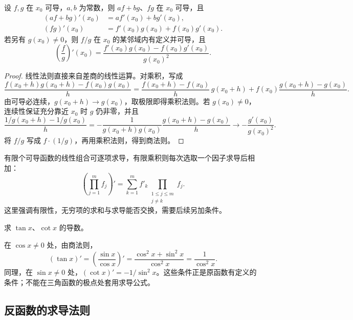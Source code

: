 \documentclass[UTF8,12pt,a4paper,fontset=fandol]{ctexbook}
\begin{document}
\begin{theorem}
\label{thm:arithmetic-differentiation-rules}
设 $f,g$ 在 $x_0$ 可导，$a,b$ 为常数，则 $af+bg$、$fg$ 在 $x_0$ 可导，且
\begin{align}
    (af+bg)'(x_0)&=af'(x_0)+bg'(x_0),\label{eq:derivative-linearity}\\
    (fg)'(x_0)&=f'(x_0)g(x_0)+f(x_0)g'(x_0).\label{eq:derivative-product-rule}
\end{align}
若另有 $g(x_0)\ne0$，则 $f/g$ 在 $x_0$ 的某邻域内有定义并可导，且
\begin{equation}
\label{eq:derivative-quotient-rule}
    \left(\frac fg\right)'(x_0)
    =\frac{f'(x_0)g(x_0)-f(x_0)g'(x_0)}{g(x_0)^2}.
\end{equation}
\end{theorem}
\begin{proof}
线性法则直接来自差商的线性运算。对乘积，写成
\[
    \frac{f(x_0+h)g(x_0+h)-f(x_0)g(x_0)}h
    =\frac{f(x_0+h)-f(x_0)}h\,g(x_0+h)
    +f(x_0)\frac{g(x_0+h)-g(x_0)}h.
\]
由可导必连续，$g(x_0+h)\to g(x_0)$，取极限即得乘积法则。若 $g(x_0)\ne0$，连续性保证充分靠近 $x_0$ 时 $g$ 仍非零，并且
\[
    \frac{1/g(x_0+h)-1/g(x_0)}h
    =-\frac1{g(x_0+h)g(x_0)}
    \frac{g(x_0+h)-g(x_0)}h
    \longrightarrow-\frac{g'(x_0)}{g(x_0)^2}.
\]
将 $f/g$ 写成 $f\cdot(1/g)$，再用乘积法则，得到商法则。
\end{proof}

有限个可导函数的线性组合可逐项求导，有限乘积则每次选取一个因子求导后相加：
\[
    \left(\prod_{j=1}^m f_j\right)'
    =\sum_{k=1}^m f'_k\prod_{\substack{1\leq j\leq m\\j\ne k}}f_j.
\]
这里强调有限性，无穷项的求和与求导能否交换，需要后续另加条件。

\begin{example}
\label{ex:derivatives-of-tangent-and-cotangent}
求 $\tan x$、$\cot x$ 的导数。
\end{example}
\begin{solve}
在 $\cos x\ne0$ 处，由商法则，
\[
    (\tan x)'=\left(\frac{\sin x}{\cos x}\right)'
    =\frac{\cos^2x+\sin^2x}{\cos^2x}=\frac1{\cos^2x}.
\]
同理，在 $\sin x\ne0$ 处，$(\cot x)'=-1/\sin^2x$。这些条件正是原函数有定义的条件；不能在三角函数的极点处套用求导公式。
\end{solve}

\subsection{反函数的求导法则}
\label{subsec:inverse-function-rule}
\end{document}
